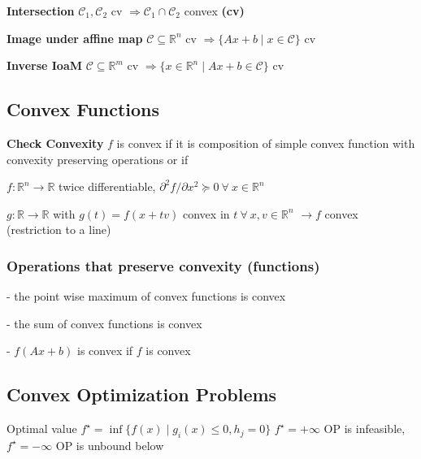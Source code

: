 

\textbf{Intersection}
$\mathcal{C}_1, \mathcal{C}_2$ cv
$\Rightarrow \mathcal{C}_1 \cap \mathcal{C}_2$ convex \textbf{(cv)}

\textbf{Image under affine map}
$\mathcal{C} \subseteq  \mathbb{R}^{n}$ cv
$\Rightarrow \{Ax+b \mid x \in \mathcal{C} \}$ cv

\textbf{Inverse IoaM}
$\mathcal{C} \subseteq  \mathbb{R}^{m}$ cv
$\Rightarrow \{x\in\mathbb{R}^{n} \mid  Ax+b\in\mathcal{C}\}$ cv

\subsection{Convex Functions}


\textbf{Check Convexity} $f$ is convex if it is
composition of simple convex function
with convexity preserving operations
or if


$f: \mathbb{R}^n \rightarrow \mathbb{R}$ twice differentiable,
$\partial^2f/\partial x^2 \succeq 0\ \forall\ x \in \mathbb{R}^{n}$

$g: \mathbb{R} \rightarrow \mathbb{R}$ with $g(t)=f(x+tv)$
convex in $t\ \forall\ x,v \in \mathbb{R}^{n}$
$\rightarrow f$ convex (restriction to a line)



\subsubsection{Operations that preserve convexity (functions)}

- the point wise maximum of convex functions is convex

- the sum of convex functions is convex

- $f(Ax+b)$ is convex if $f$ is convex

\subsection{Convex Optimization Problems}


Optimal value $f^\star =
	\operatorname{inf}\{f(x)\mid
	g_i(x)\le0,h_j=0 \}$
$f^\star=+\infty$ OP is infeasible,
$f^\star=-\infty$ OP is unbound below


